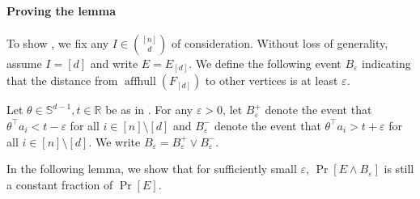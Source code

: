 \documentclass{theoretics}
\newcommand{\R}{\mathbb R}
\newcommand{\T}{\top}
\newcommand{\aff}{\operatorname{affhull}}
\newcommand{\eps}{\varepsilon} %
\renewcommand{\epsilon}{\varepsilon} %
\begin{document}
\paragraph{Proving the lemma}
To show , we fix any $I \in \binom{[n]}{d}$ of consideration.
Without loss of generality, assume $I = [d]$ and write $E = E_{[d]}$.
We define the following event $B_{\epsilon}$ indicating that the distance from
$\aff(F_{[d]})$ to other vertices is at least $\epsilon$.

\begin{definition}\label{def:Beps}
    Let $\theta \in \mathbb S^{d-1}, t \in \R$ be as in .
For any $\eps > 0$, let $B_\eps^+$ denote the event that
$\theta^\T a_i < t - \eps$ for all $i \in [n]\setminus[d]$
and $B_\eps^-$ denote the event that
$\theta^\T a_i > t + \eps$ for all $i \in [n]\setminus[d]$.
We write $B_\eps = B_\eps^+ \vee B_\eps^-$.
\end{definition}

In the following lemma, we show that for sufficiently small $\epsilon$, $\Pr[E \wedge B_{\epsilon}]$ is still a constant fraction of $\Pr[E]$.
\end{document}
